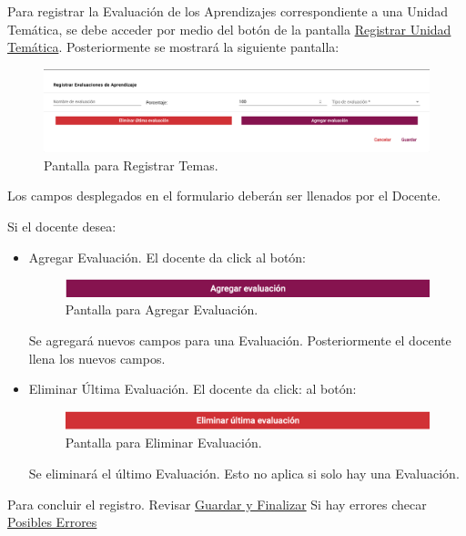 Para registrar la Evaluación de los Aprendizajes correspondiente a una Unidad Temática, se debe acceder por medio del botón  de la pantalla \hyperlink{RUT}{Registrar Unidad Temática}. Posteriormente se mostrará la siguiente pantalla:

\hypertarget{REvalApre}{}
\begin{figure}[H]
    \centering
    \includegraphics[width=0.7\linewidth]{images/SP6/RegistrarEvadeApren.png}
    \caption{Pantalla para Registrar Temas.}
\end{figure}

Los campos desplegados en el formulario deberán ser llenados por el Docente.

Si el docente desea:
\begin{itemize}
    \item Agregar Evaluación. El docente da click al botón:
    \begin{figure}[H]
    \centering
    \includegraphics[width=0.4\linewidth]{images/SP6/AgregarEval.png}
    \caption{Pantalla para Agregar Evaluación.}
    \end{figure}
    Se agregará nuevos campos para una Evaluación. Posteriormente el docente llena los nuevos campos.
    \item Eliminar Última Evaluación. El docente da click: al botón:
    \begin{figure}[H]
    \centering
    \includegraphics[width=0.4\linewidth]{images/SP6/ElimarEval.png}
    \caption{Pantalla para Eliminar Evaluación.}
    \end{figure}
    Se eliminará el último Evaluación. Esto no aplica si solo hay una Evaluación.
\end{itemize}

Para concluir el registro. Revisar \hyperlink{GuardarFinalizar}{Guardar y Finalizar}
Si hay errores checar \hyperlink{Errores}{Posibles Errores}
\pagebreak

